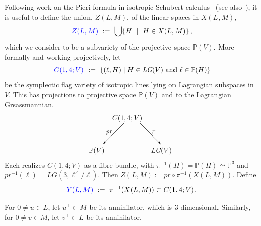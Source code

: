 \documentclass[12pt]{amsart}
\theoremstyle{remark}
\newcommand{\LG}{\textit{LG}}
\newcommand{\pr}{\textit{pr}}
\newcommand{\PP}{{\mathbb P}}
\newcommand{\defcolor}[1]{{\color{blue}#1}}
\begin{document}
Following work on the Pieri formula in isotropic Schubert calculus~\cite{MaxPieri} (see also~\cite{EPieri}), 
it is useful to define the union, $Z(L,M)$, of the linear spaces in $X(L,M)$,
\[
\defcolor{Z(L,M)}\ :=\  \bigcup\{ H\ \mid\ H\in X(L,M)\}\,,
\]
which we  consider to be a subvariety of the projective space $\PP(V)$.
More formally and working projectively, let
\[
\defcolor{C(1,4;V)}\ :=\ \{(\ell,H)\mid H\in\LG(V)\mbox{ and }\ell\in\PP(H)\}
\]
be the symplectic flag variety of
isotropic lines lying on Lagrangian subspaces in $V$.
This has projections to projective space $\PP(V)$ and to the Lagrangian Grsassmannian.
%
\[
  \begin{picture}(122,55)
    \put(33,46){$C(1,4;V)$}
    \put(50,42){\vector(-1,-1){30}}      \put(72,42){\vector(1,-1){30}}
    \put(24,27){\small$\pr$}           \put(89,27){\small$\pi$}
    \put(0,0){$\PP(V)$}   \put(88,0){$\LG(V)$}
  \end{picture}
\]
%
Each realizes $C(1,4;V)$ as a fibre bundle, with $\pi^{-1}(H)=\PP(H)\simeq\PP^3$ and $\pr^{-1}(\ell)=\LG(3,\ell^\angle/\ell)$.
Then $Z(L,M):=\pr\circ\pi^{-1}(X(L,M))$.
Define
\[
\defcolor{Y(L,M)}\ :=\ \pi^{-1}(X(L,M))\subset C(1,4;V)\,.
\]

For $0\neq u\in L$, let $u^\perp \subset M$ be its annihilator, which is 3-dimensional.
Similarly, for $0\neq v\in M$, let $v^\perp\subset L$ be its annihilator.
\end{document}
